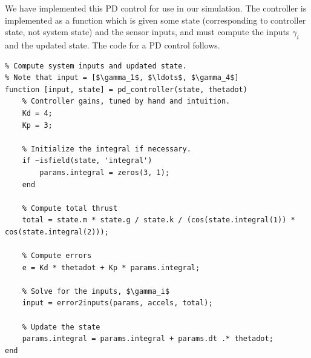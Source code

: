 \documentclass{article}
\begin{document}
\newpage
We have implemented this PD control for use in our simulation. The controller is implemented as a
function which is given some state (corresponding to controller state, not system state) and the
sensor inputs, and must compute the inputs $\gamma_i$ and the updated state. The code for a PD
control follows.
\begin{verbatim}
% Compute system inputs and updated state.
% Note that input = [$\gamma_1$, $\ldots$, $\gamma_4$]
function [input, state] = pd_controller(state, thetadot)
    % Controller gains, tuned by hand and intuition.
    Kd = 4;
    Kp = 3;

    % Initialize the integral if necessary.
    if ~isfield(state, 'integral')
        params.integral = zeros(3, 1);
    end

    % Compute total thrust
    total = state.m * state.g / state.k / (cos(state.integral(1)) * cos(state.integral(2)));

    % Compute errors
    e = Kd * thetadot + Kp * params.integral;

    % Solve for the inputs, $\gamma_i$
    input = error2inputs(params, accels, total);

    % Update the state
    params.integral = params.integral + params.dt .* thetadot;
end
\end{verbatim}
\end{document}

